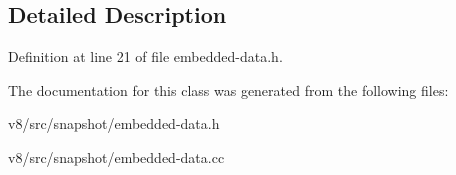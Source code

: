 \subsection{Detailed Description}


Definition at line 21 of file embedded-\/data.\+h.



The documentation for this class was generated from the following files\+:\begin{DoxyCompactItemize}
\item 
v8/src/snapshot/embedded-\/data.\+h\item 
v8/src/snapshot/embedded-\/data.\+cc\end{DoxyCompactItemize}
